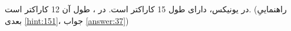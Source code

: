\section{}
\paragraph{}\label{hint:243}
در یونیکس،  دارای طول 15 کاراکتر است. در ، طول آن 12 کاراکتر است. (راهنماییِ بعدی \ref{hint:151}، جواب \ref{answer:37})